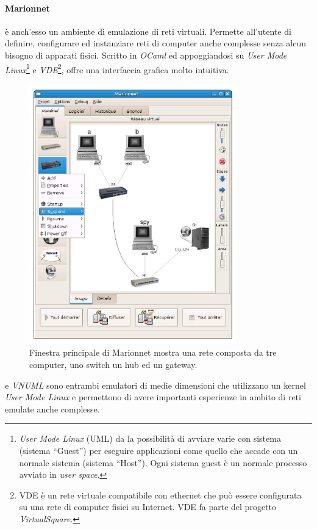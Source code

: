 \paragraph{Marionnet}\cite{MVNL08} è anch'esso un ambiente di emulazione di reti virtuali. Permette all'utente di definire, configurare ed instanziare reti di computer anche complesse senza alcun bisogno di apparati fisici. Scritto in \textit{OCaml} ed appoggiandosi su \emph{User Mode Linux}\footnote{\emph{User Mode Linux} (UML) da la possibilità di avviare varie \virtualmachine{} con sistema \linux{} (sistema ``Guest'') per eseguire applicazioni come quello che accade con un normale sistema \linux{} (sistema ``Host''). Ogni sistema guest è un normale processo avviato in \emph{user space}.} e \textit{VDE}\footnote{VDE è un  rete virtuale compatibile con ethernet che può essere configurata su una rete di computer fisici su Internet. VDE fa parte del progetto \textit{VirtualSquare}.}, offre una interfaccia grafica molto intuitiva.
\begin{figure}[!ht]
	\centering
	\includegraphics[width=9cm]{images/marionnet_gui.png}
	\caption{Finestra principale di Marionnet mostra una rete composta da tre computer, uno switch un hub ed un gateway.}
	\label{figura:marionnet_gui}
\end{figure}

\netkit{}\cite{NETKIT}  e \emph{VNUML}\cite{VNUMLT} sono entrambi emulatori di medie dimensioni che utilizzano un kernel \emph{User Mode Linux} e permettono di avere importanti esperienze in ambito di reti emulate anche complesse.

